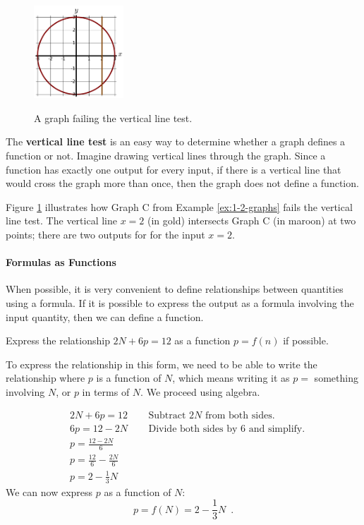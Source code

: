 \begin{figure}
    \centering
    \vspace{-12pt}
    \includegraphics[width=0.3\textwidth]{img/chap1/sec1-2/fig115.png}\\
    \caption{A graph failing the vertical line test.}
    \label{fig:1-2-115}
\end{figure}
The \textbf{vertical line test} is an easy way to determine whether a graph defines a function or not. Imagine drawing vertical lines through the graph. Since a function has exactly one output for every input, if there is a vertical line that would cross the graph more than once, then the graph does not define a function.

Figure \ref{fig:1-2-115} illustrates how Graph C from Example \ref{ex:1-2-graphs} fails the vertical line test. The vertical line $x=2$ (in gold) intersects Graph C (in maroon) at two points; there are two outputs for for the input $x=2$.

\paragraph{Formulas as Functions}

When possible, it is very convenient to define relationships between quantities using a formula. If it is possible to express the output as a formula involving the input quantity, then we can define a function.

\begin{example}
Express the relationship $2N + 6p = 12$ as a function $p = f(n)$ if possible.

\begin{solution} To express the relationship in this form, we need to be able to write
the relationship where $p$ is a function of $N$, which means
writing it as $p = $ something involving $N$, or $p$ in terms of $N$. We proceed using algebra.

\begin{align*}
&2N + 6p = 12&\enspace &\mbox{Subtract $2N$ from both sides.}\\
&6p = 12 - 2N&\enspace  &\mbox{Divide both sides by 6 and simplify.}\\
&p = \frac{12-2N}{6}& & \\
&p = \frac{12}{6} - \frac{2N}{6} & &\\
&p = 2 - \frac{1}{3}N & &
\end{align*}
We can now express $p$ as a function of $N$:
$$p = f(N) = 2 - \frac{1}{3}N \enspace .$$
\end{solution}\end{example}

